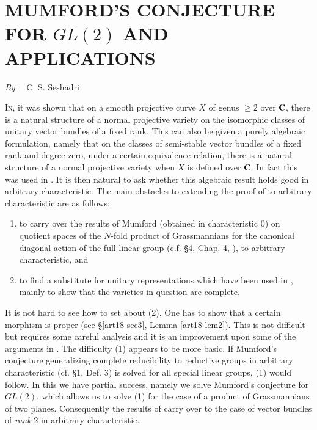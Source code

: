 \chapter[\textsc{C. S. Seshadri~:} Mumford's Conjecture for $GL(2)$ and Applications]{MUMFORD'S CONJECTURE FOR $GL(2)$ AND APPLICATIONS}\label{art18}

\begin{center}
{\em By}~~ C. S. Seshadri
\end{center}


\setcounter{pageoriginal}{346}
\textsc{In}\pageoriginale \cite{art18-key12}, it was shown that on a smooth projective curve $X$ of genus $\geq 2$ over $\mathbf{C}$, there is a natural structure of a normal projective variety on the isomorphic classes of unitary vector bundles of a fixed rank. This can also be given a purely algebraic formulation, namely that on the classes of semi-stable vector bundles of a fixed rank and degree zero, under a certain equivalence relation, there is a natural structure of a normal projective variety when $X$ is defined over $\mathbf{C}$. In fact this was used in \cite{art18-key12}. It is then natural to ask whether this algebraic result holds good in arbitrary characteristic. The main obstacles to extending the proof of \cite{art18-key12} to arbitrary characteristic are as follows:
\begin{enumerate}
\renewcommand{\labelenumi}{(\theenumi)}
\item to carry over the results of Mumford (obtained in characteristic 0) on quotient spaces of the $N$-fold product of Grassmannians for the canonical diagonal action of the full linear group (c.f. \S4, Chap. 4, \cite{art18-key5}), to arbitrary characteristic, and

\item to find a substitute for unitary representations which have been used in \cite{art18-key12}, mainly to show that the varieties in question are complete.
\end{enumerate}

It is not hard to see how to set about (2). One has to show that a certain morphism is proper (see \S\ref{art18-sec3}, Lemma \ref{art18-lem2}). This is not difficult but requires some careful analysis and it is an improvement upon some of the arguments in \cite{art18-key12}. The difficulty (1) appears to be more basic. If Mumford's conjecture generalizing complete reducibility to reductive groups in arbitrary characteristic (cf. \S1, Def. 3) is solved for all special linear groups, (1) would follow. In this we have partial success, namely we solve Mumford's conjecture for $GL(2)$, which allows us to solve (1) for the case of a product of Grassmannians of two planes. Consequently the results of \cite{art18-key12} carry over to the case of vector bundles of {\em rank} 2 in arbitrary characteristic.

